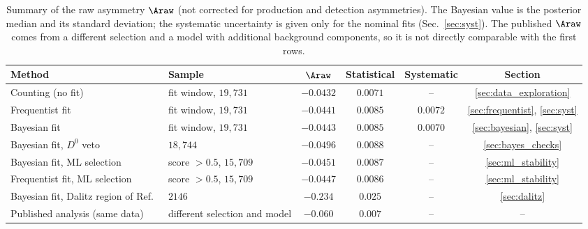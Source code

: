 \begin{table}[t]
\centering
\begin{tabular}{llcccc}
\toprule
Method & Sample & $\Araw$ & Statistical & Systematic & Section \\
\midrule
Counting (no fit) & fit window, $19{,}731$ & $-0.0432$ & $0.0071$ & -- & \ref{sec:data_exploration} \\
Frequentist fit & fit window, $19{,}731$ & $-0.0441$ & $0.0085$ & $0.0072$ & \ref{sec:frequentist}, \ref{sec:syst} \\
Bayesian fit & fit window, $19{,}731$ & $-0.0443$ & $0.0085$ & $0.0070$ & \ref{sec:bayesian}, \ref{sec:syst} \\
Bayesian fit, $D^0$ veto & $18{,}744$ & $-0.0496$ & $0.0088$ & -- & \ref{sec:bayes_checks} \\
Bayesian fit, ML selection & score $>0.5$, $15{,}709$ & $-0.0451$ & $0.0087$ & -- & \ref{sec:ml_stability} \\
Frequentist fit, ML selection & score $>0.5$, $15{,}709$ & $-0.0447$ & $0.0086$ & -- & \ref{sec:ml_stability} \\
Bayesian fit, Dalitz region of Ref.~\cite{lhcb_cpv_2013} & $2146$ & $-0.234$ & $0.025$ & -- & \ref{sec:dalitz} \\
\midrule
Published analysis (same data)~\cite{lhcb_cpv_2013} & different selection and model & $-0.060$ & $0.007$ & -- & -- \\
\bottomrule
\end{tabular}
\caption{Summary of the raw asymmetry $\Araw$ (not corrected for production and detection asymmetries). The Bayesian value is the posterior median and its standard deviation; the systematic uncertainty is given only for the nominal fits (Sec.~\ref{sec:syst}). The published $\Araw$ comes from a different selection and a model with additional background components, so it is not directly comparable with the first rows.}
\label{tab:summary}
\end{table}

